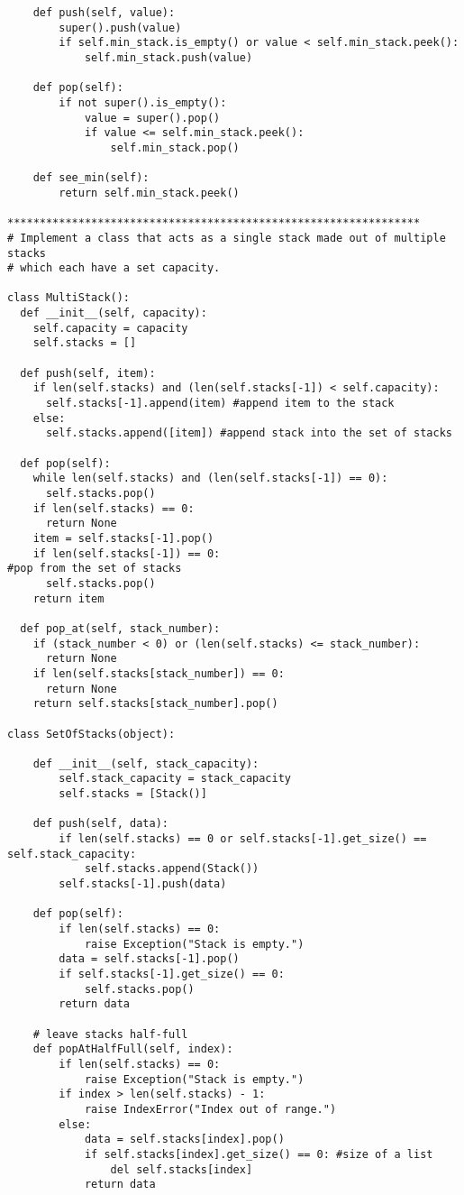 \documentclass[12pt]{article}
\begin{document}
\begin{lstlisting}
    def push(self, value):
        super().push(value)
        if self.min_stack.is_empty() or value < self.min_stack.peek():
            self.min_stack.push(value)

    def pop(self):
        if not super().is_empty():
            value = super().pop()
            if value <= self.min_stack.peek():
                self.min_stack.pop()

    def see_min(self):
        return self.min_stack.peek()
        
****************************************************************
# Implement a class that acts as a single stack made out of multiple stacks
# which each have a set capacity.

class MultiStack():
  def __init__(self, capacity):
    self.capacity = capacity
    self.stacks = []
  
  def push(self, item):
    if len(self.stacks) and (len(self.stacks[-1]) < self.capacity):
      self.stacks[-1].append(item) #append item to the stack
    else:
      self.stacks.append([item]) #append stack into the set of stacks
  
  def pop(self):
    while len(self.stacks) and (len(self.stacks[-1]) == 0):
      self.stacks.pop()
    if len(self.stacks) == 0:
      return None
    item = self.stacks[-1].pop()
    if len(self.stacks[-1]) == 0:
#pop from the set of stacks
      self.stacks.pop()
    return item
  
  def pop_at(self, stack_number):
    if (stack_number < 0) or (len(self.stacks) <= stack_number):
      return None
    if len(self.stacks[stack_number]) == 0:
      return None
    return self.stacks[stack_number].pop()

class SetOfStacks(object):

    def __init__(self, stack_capacity):
        self.stack_capacity = stack_capacity
        self.stacks = [Stack()]

    def push(self, data):
        if len(self.stacks) == 0 or self.stacks[-1].get_size() == self.stack_capacity:
            self.stacks.append(Stack())
        self.stacks[-1].push(data)

    def pop(self):
        if len(self.stacks) == 0:
            raise Exception("Stack is empty.")
        data = self.stacks[-1].pop()
        if self.stacks[-1].get_size() == 0:
            self.stacks.pop()
        return data

    # leave stacks half-full
    def popAtHalfFull(self, index):
        if len(self.stacks) == 0:
            raise Exception("Stack is empty.")
        if index > len(self.stacks) - 1:
            raise IndexError("Index out of range.")
        else:
            data = self.stacks[index].pop()
            if self.stacks[index].get_size() == 0: #size of a list
                del self.stacks[index]
            return data


\end{lstlisting}
\end{document}
